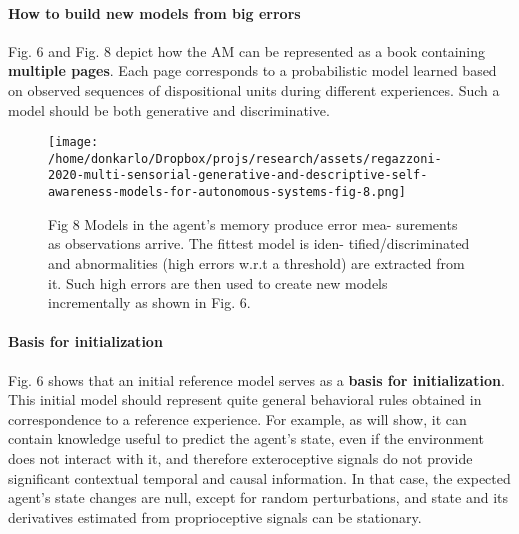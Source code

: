\documentclass{article}
\begin{document}
		\paragraph{How to build new models from big errors}
		\citet{regazzoni-2020-multi-sensorial-generative-and-descriptive-self-awareness-models-for-autonomous-systems} Fig. 6 and Fig. \citet{regazzoni-2020-multi-sensorial-generative-and-descriptive-self-awareness-models-for-autonomous-systems} 8 depict how the AM can be represented as
		a book containing \textbf{multiple pages}. Each page corresponds to
		a probabilistic model learned based on observed sequences of
		dispositional units during different experiences. Such a model
		should be both generative and discriminative. 
		\begin{figure*}
			\centering
			\texttt{[image: /home/donkarlo/Dropbox/projs/research/assets/regazzoni-2020-multi-sensorial-generative-and-descriptive-self-awareness-models-for-autonomous-systems-fig-8.png]}
			\caption{\cite{regazzoni-2020-multi-sensorial-generative-and-descriptive-self-awareness-models-for-autonomous-systems} Fig 8 Models in the agent’s memory produce error mea-
				surements as observations arrive. The fittest model is iden-
				tified/discriminated and abnormalities (high errors w.r.t a
				threshold) are extracted from it. Such high errors are then
				used to create new models incrementally as shown in Fig. 6.
			}
			\label{fig:regazzoni-2020-multi-sensorial-generative-and-descriptive-self-awareness-models-for-autonomous-systems-fig-8.png}
		\end{figure*}	
		\paragraph{Basis for initialization} \citet{regazzoni-2020-multi-sensorial-generative-and-descriptive-self-awareness-models-for-autonomous-systems}Fig. 6 shows that
		an initial reference model serves as a \textbf{basis for initialization}.
		This initial model should represent quite general behavioral
		rules obtained in correspondence to a reference experience. For
		example, as \citet{regazzoni-2020-multi-sensorial-generative-and-descriptive-self-awareness-models-for-autonomous-systems} will show, it can contain knowledge useful to
		predict the agent’s state, even if the environment does not interact with it, and therefore exteroceptive signals do not provide
		significant contextual temporal and causal information. In that
		case, the expected agent’s state changes are null, except for
		random perturbations, and state and its derivatives estimated
		from proprioceptive signals can be stationary.
\end{document}
